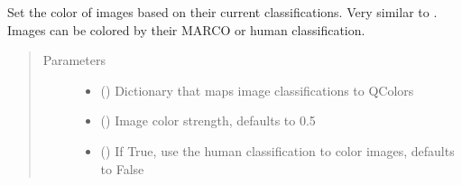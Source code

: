 \documentclass[letterpaper,10pt,english]{sphinxmanual}
\begin{document}
\begin{fulllineitems}
\begin{fulllineitems}
\label{\detokenize{polo.widgets:polo.widgets.plate_viewer.plateViewer.set_scene_colors_from_filters}}
Set the color of images based on their current classifications. Very similar
to .
Images can be colored by their MARCO or human classification.
\begin{quote}\begin{description}
\item[{Parameters}] \leavevmode\begin{itemize}
\item {} 
 () \textendash{} Dictionary that maps image classifications to QColors

\item {} 
 (\sphinxstyleliteralemphasis{\sphinxupquote{, }}) \textendash{} Image color strength, defaults to 0.5

\item {} 
 (\sphinxstyleliteralemphasis{\sphinxupquote{, }}) \textendash{} If True, use the human classification to color images,
defaults to False

\end{itemize}

\end{description}\end{quote}

\end{fulllineitems}



\end{fulllineitems}
\end{document}
